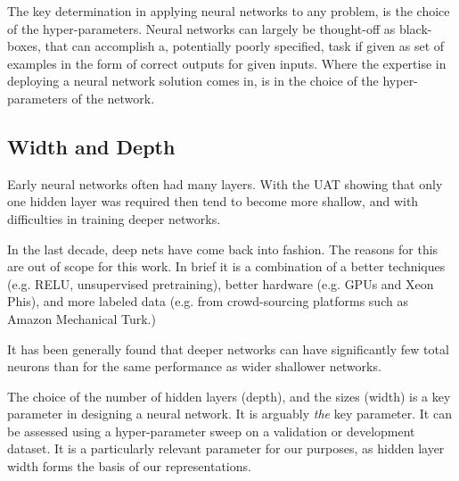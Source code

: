 \documentclass[12pt,parskip]{komatufte}
\begin{document}
The key determination in applying neural networks to any problem,
is the choice of the hyper-parameters.
Neural networks can largely be thought-off as black-boxes,
that can accomplish a, potentially poorly specified, task if given as set of examples in the form of correct outputs for given inputs.
Where the expertise in deploying a neural network solution comes in, is in the choice of the hyper-parameters of the network.

\subsection{Width and Depth}

Early neural networks often had many layers.
With the UAT showing that only one hidden layer was required then tend to become more shallow, and
with difficulties in training deeper networks.

In the last decade, deep nets have come back into fashion.
The reasons for this are out of scope for this work.
In brief it is a combination of a better techniques (e.g. RELU, unsupervised pretraining),
better hardware (e.g. GPUs and Xeon Phis), and more labeled data (e.g. from crowd-sourcing platforms such as Amazon Mechanical Turk.)

It has been generally found that deeper networks can have significantly few total neurons than for the same performance as wider shallower networks.

The choice of the number of hidden layers (depth),
and the sizes (width) is a key parameter in designing a neural network.
It is arguably \emph{the} key parameter.
It can be assessed using a hyper-parameter sweep on a validation or development dataset.
It is a particularly relevant parameter for our purposes, as hidden layer width forms the basis of our representations.
\end{document}
